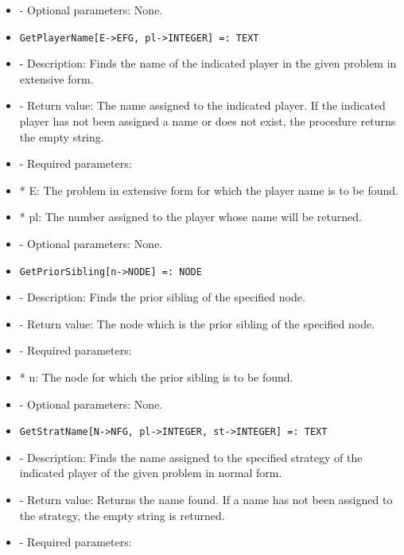 \begin{itemize}
\item
- Optional parameters:  None.
\ed

\item
\begin{verbatim}
GetPlayerName[E->EFG, pl->INTEGER] =: TEXT
\end{verbatim}

\bd
\item
- Description:  Finds the name of the indicated player in the given 
problem in extensive form.
\item
- Return value:  The name assigned to the indicated player.  If the 
indicated player has not been assigned a name or does not exist, the
procedure returns the empty string.
\item
- Required parameters:

\bd
\item  
*  E:  The problem in extensive form for which the player name is to
be found.
\item
*  pl:  The number assigned to the player whose name will be 
returned.
\ed

\item
- Optional parameters:  None.
\ed

\item
\begin{verbatim}
GetPriorSibling[n->NODE] =: NODE
\end{verbatim}

\bd
\item
- Description:  Finds the prior sibling of the specified node.
\item
- Return value:  The node which is the prior sibling of the specified node.
\item
- Required parameters:

\bd
\item
*  n:  The node for which the prior sibling is to be found.
\ed

\item
- Optional parameters:  None.
\ed

\item
\begin{verbatim}
GetStratName[N->NFG, pl->INTEGER, st->INTEGER] =: TEXT
\end{verbatim}

\bd
\item
- Description:  Finds the name assigned to the specified strategy of
the indicated player of the given problem in normal form.
\item
- Return value:  Returns the name found.  If a name has not been assigned
to the strategy, the empty string is returned.
\item
- Required parameters:


\end{itemize}
